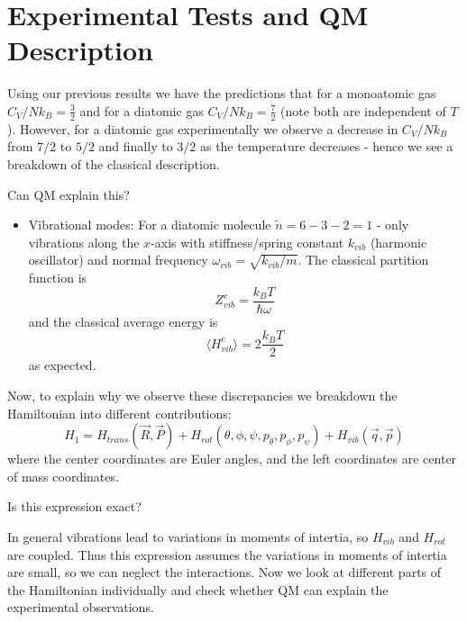 \documentclass[12pt, a4paper, oneside, openright, titlepage]{book}
\begin{document}
\section{Experimental Tests and QM Description}


Using our previous results we have the predictions that for a monoatomic gas $C_V/Nk_B = \frac{3}{2}$ and for a diatomic gas $C_V/Nk_B = \frac{7}{2}$ (note both are independent of $T$). However, for a diatomic gas experimentally we observe a decrease in $C_V/Nk_B$ from $7/2$ to $5/2$ and finally to $3/2$ as the temperature decreases - hence we see a breakdown of the classical description.

\begin{qst}
    Can QM explain this?
\end{qst}

\begin{itemize}
    \item Vibrational modes: For a diatomic molecule $\tilde{n} = 6-3-2 = 1$ - only vibrations along the $x$-axis with stiffness/spring constant $k_{vib}$ (harmonic oscillator) and normal frequency $\omega_{vib} = \sqrt{k_{vib}/m}$. The classical partition function is \begin{equation*}
            Z_{vib}^c = \frac{k_BT}{\hbar\omega}
    \end{equation*}
        and the classical average energy is \begin{equation*}
            \langle H_{vib}^c\rangle = 2\frac{k_BT}{2}
        \end{equation*}
        as expected.
\end{itemize}

Now, to explain why we observe these discrepancies we breakdown the Hamiltonian into different contributions: \begin{equation*}
    H_1 = H_{trans}(\vec{R},\vec{P}) + H_{rot}(\theta,\phi,\psi,p_{\theta},p_{\phi},p_{\psi}) + H_{vib}(\vec{q},\vec{p})
\end{equation*}
where the center coordinates are Euler angles, and the left coordinates are center of mass coordinates.

\begin{qst}
    Is this expression exact?
\end{qst}
In general vibrations lead to variations in moments of intertia, so $H_{vib}$ and $H_{rot}$ are coupled. Thus this expression assumes the variations in moments of intertia are small, so we can neglect the interactions. Now we look at different parts of the Hamiltonian individually and check whether QM can explain the experimental observations.
\end{document}
